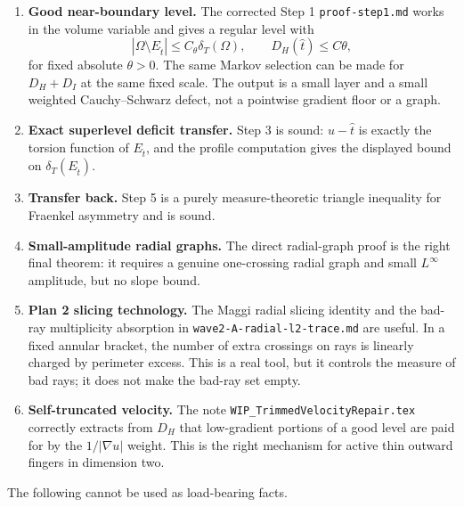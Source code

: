 \documentclass[11pt]{article}
\newcommand{\Om}{\Omega}
\newcommand{\dT}{\delta_T}
\begin{document}
\begin{enumerate}
\item \textbf{Good near-boundary level.}  The corrected Step 1
\texttt{proof-step1.md} works in the volume variable and gives a
regular level with
\[
   |\Om\setminus E_{\hat t}|\le C_\theta \dT(\Om),
   \qquad
   D_H(\hat t)\le C\theta ,
\]
for fixed absolute \(\theta>0\).  The same Markov selection can be made
for \(D_H+D_I\) at the same fixed scale.  The output is a small layer
and a small weighted Cauchy--Schwarz defect, not a pointwise gradient
floor or a graph.

\item \textbf{Exact superlevel deficit transfer.}  Step 3 is sound:
\(u-\hat t\) is exactly the torsion function of \(E_{\hat t}\), and the
profile computation gives the displayed bound on \(\dT(E_{\hat t})\).

\item \textbf{Transfer back.}  Step 5 is a purely measure-theoretic
triangle inequality for Fraenkel asymmetry and is sound.

\item \textbf{Small-amplitude radial graphs.}  The direct radial-graph
proof is the right final theorem: it requires a genuine one-crossing
radial graph and small \(L^\infty\) amplitude, but no slope bound.

\item \textbf{Plan 2 slicing technology.}  The Maggi radial slicing
identity and the bad-ray multiplicity absorption in
\texttt{wave2-A-radial-l2-trace.md} are useful.  In a fixed annular
bracket, the number of extra crossings on rays is linearly charged by
perimeter excess.  This is a real tool, but it controls the measure of
bad rays; it does not make the bad-ray set empty.

\item \textbf{Self-truncated velocity.}  The note
\texttt{WIP\_TrimmedVelocityRepair.tex} correctly extracts from
\(D_H\) that low-gradient portions of a good level are paid for by the
\(1/|\nabla u|\) weight.  This is the right mechanism for active thin
outward fingers in dimension two.
\end{enumerate}

The following cannot be used as load-bearing facts.
\end{document}
